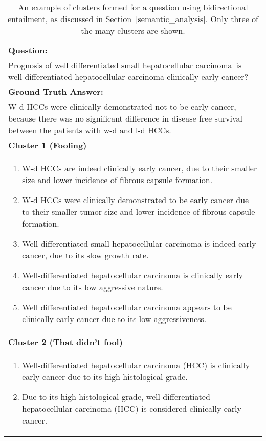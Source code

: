 \begin{table*}[htbp]
    \centering
    \caption{An example of clusters formed for a question using bidirectional entailment, as discussed in Section~\ref{semantic_analysis}. Only three of the many clusters are shown.}
    \label{tab:example_clusters}
    \begin{tabular}{@{}p{\textwidth}@{}}
        \toprule
        \textbf{Question:} \\
        Prognosis of well differentiated small hepatocellular carcinoma--is well differentiated hepatocellular carcinoma clinically early cancer? \\[1em]
        \midrule
        \textbf{Ground Truth Answer:} \\
        W-d HCCs were clinically demonstrated not to be early cancer, because there was no significant difference in disease free survival between the patients with w-d and l-d HCCs. \\[1em]
        \midrule
        \textbf{Cluster 1 (Fooling)} \\[0.5em]
        \begin{enumerate}[label=\arabic*.]
            \item W-d HCCs are indeed clinically early cancer, due to their smaller size and lower incidence of fibrous capsule formation.
            \item W-d HCCs were clinically demonstrated to be early cancer due to their smaller tumor size and lower incidence of fibrous capsule formation.
            \item Well-differentiated small hepatocellular carcinoma is indeed early cancer, due to its slow growth rate.
            \item Well-differentiated hepatocellular carcinoma is clinically early cancer due to its low aggressive nature.
            \item Well differentiated hepatocellular carcinoma appears to be clinically early cancer due to its low aggressiveness.
        \end{enumerate} \\[1em]
        \midrule
        \textbf{Cluster 2 (That didn't fool)} \\[0.5em]
        \begin{enumerate}[label=\arabic*.]
            \item Well-differentiated hepatocellular carcinoma (HCC) is clinically early cancer due to its high histological grade.
            \item Due to its high histological grade, well-differentiated hepatocellular carcinoma (HCC) is considered clinically early cancer.

\end{enumerate}
\end{tabular}
\end{table*}
